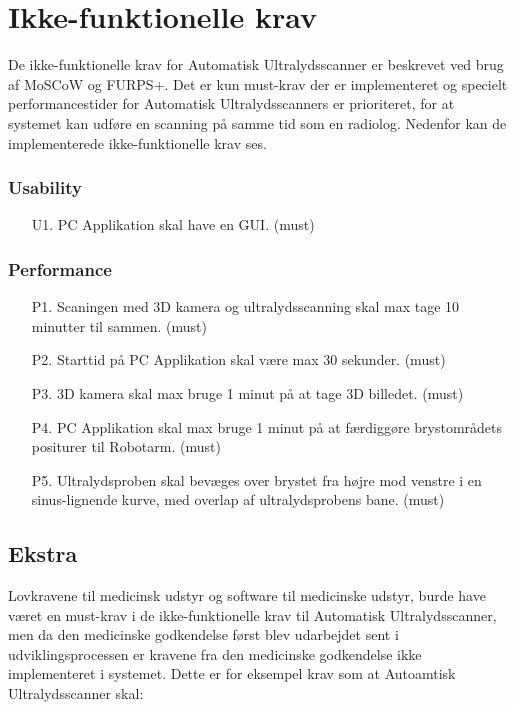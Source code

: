 \section{Ikke-funktionelle krav}
De ikke-funktionelle krav for Automatisk Ultralydsscanner er beskrevet ved brug af MoSCoW og FURPS+. Det er kun must-krav der er implementeret og specielt performancestider for Automatisk Ultralydsscanners er prioriteret, for at systemet kan udføre en scanning på samme tid som en radiolog. Nedenfor kan de implementerede ikke-funktionelle krav ses. 

\subsubsection{Usability}
\begin{itemize}
    \item [U1.] PC Applikation skal have en GUI. (must)
\end{itemize}

\subsubsection{Performance}
\begin{itemize}
    \item[P1.] Scaningen med 3D kamera og ultralydsscanning skal max tage 10 minutter til sammen. (must) 
    \item[P2.] Starttid på PC Applikation skal være max 30 sekunder. (must)
    \item[P3.] 3D kamera skal max bruge 1 minut på at tage 3D billedet. (must)
    \item[P4.] PC Applikation skal max bruge 1 minut på at færdiggøre brystområdets positurer til Robotarm. (must)
   \item[P5.] Ultralydsproben skal bevæges over brystet fra højre mod venstre i en sinus-lignende kurve, med overlap af ultralydsprobens bane. (must)
\end{itemize}

\subsection{Ekstra}
Lovkravene til medicinsk udstyr og software til medicinske udstyr, burde have været en must-krav i de ikke-funktionelle krav til Automatisk Ultralydsscanner, men da den medicinske godkendelse først blev udarbejdet sent i udviklingsprocessen er kravene fra den medicinske godkendelse ikke implementeret i systemet. Dette er for eksempel krav som at Autoamtisk Ultralydsscanner skal: 

